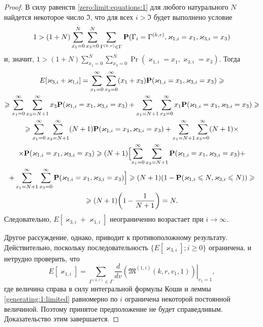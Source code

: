 \documentclass[a4paper,12pt,russian]{extarticle}
\begin{document}
\begin{proof}
В силу равенств \eqref{zero:limit:equations:1} для любого натурального $N$ найдется некоторое число $\mathfrak{I}$, что для всех $i > \mathfrak{I}$ будет выполнено условие
$$1 > (1+N) \sum_{x_1=0}^{N}\sum_{x_3=0}^{N} \sum_{\Gamma^{(k,r)}\in \Gamma}  \Pr(\Gamma_{i}=\Gamma^{(k,r)}, \varkappa_{1,i} \hm{} = x_1, \varkappa_{3,i}=x_3)$$
и, значит, $1 >(1+N) \sum_{x_1=0}^{N}\sum_{x_3=0}^{N} \Pr(\varkappa_{1,i} = x_1, \varkappa_{3,i}=x_3)$. Тогда
\begin{multline*}
E[\varkappa_{3,i}+\varkappa_{1,i}] = \sum_{x_1=0}^{\infty}\sum_{x_3=0}^{\infty} (x_1 + x_3) \Pr(\varkappa_{1,i} = x_1, \varkappa_{3,i}=x_3) \geqslant \\
\geqslant
 \sum_{x_1=0}^{\infty}\sum_{x_3=N+1}^{\infty} x_3 \Pr(\varkappa_{1,i} = x_1, \varkappa_{3,i}=x_3) +  \sum_{x_1=N+1}^{\infty}\sum_{x_3=0}^{\infty} x_1 \Pr(\varkappa_{1,i} = x_1, \varkappa_{3,i}=x_3) \geqslant \\
 \geqslant
  \sum_{x_1=0}^{\infty}\sum_{x_3=N+1}^{\infty} (N+1) \Pr(\varkappa_{1,i} = x_1, \varkappa_{3,i}=x_3) + \sum_{x_1=N+1}^{\infty}\sum_{x_3=0}^{\infty} (N+1) \times \\ \times \Pr(\varkappa_{1,i} = x_1, \varkappa_{3,i}=x_3)
  \geqslant
  (N+1)\Bigl[\sum_{x_1=0}^{\infty}\sum_{x_3=N+1}^{\infty} \Pr(\varkappa_{1,i} = x_1, \varkappa_{3,i}=x_3) + \\+ \sum_{x_1=N+1}^{\infty}\sum_{x_3=0}^{\infty}\Pr(\varkappa_{1,i} = x_1, \varkappa_{3,i}=x_3)\Bigr] 
  \geqslant (N+1)(1-\Pr(\varkappa_{1,i} \leqslant N, \varkappa_{3,i} \leqslant N)  ) 
  \geqslant \\ \geqslant
  (N+1)\biggl(1-\frac{1}{N+1}\biggr) = N.
\end{multline*}
Следовательно, $E[\varkappa_{3,i}+\varkappa_{1,i}]$ неограниченно возрастает при $i \to \infty$. 

Другое рассуждение, однако, приводит к противоположному результату. Действительно, поскольку последовательность $\{E[\varkappa_{3,i}]; i \geqslant 0\}$ ограничена, и нетрудно проверить, что
$$
E[\varkappa_{1,i}] =\sum_{\Gamma^{(k,r)}\in \Gamma} \frac{d}{dv}\left.\left(\mathfrak{M}^{(1,i)}(k,r,v_1,1)\right)\right|_{v_1=1},
$$
где величина справа в силу интегральной формулы Коши и леммы \ref{generating:1:limited} равномерно по $i$ ограничена некоторой постоянной величиной. 
 Поэтому принятое предположение не будет справедливым. Доказательство этим завершается.
\end{proof}
\end{document}
